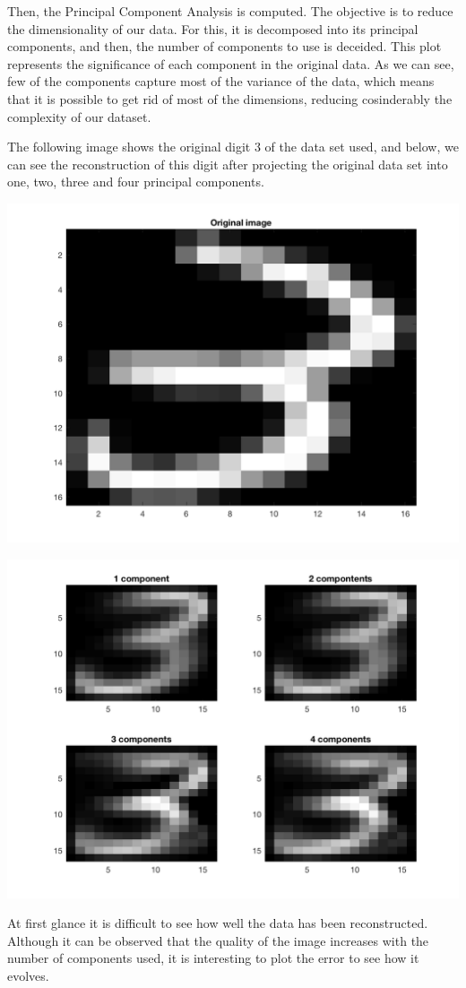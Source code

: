 \documentclass[10pt]{article}
\begin{document}
\begin{multicols}{2}
  Then, the Principal Component Analysis is computed. The objective is to reduce the
  dimensionality of our data. For this, it is decomposed into its principal components,
  and then, the number of components to use is deceided. This plot represents the
  significance of each component in the original data. As we can see,
  few of the components capture most of the variance of the data, which means that it
  is possible to get rid of most of the dimensions, reducing cosinderably the complexity
  of our dataset.

  The following image shows the original digit 3 of the data set used, and below, we can see
  the reconstruction of this digit after projecting the original data set into one, two,
  three and four principal components.

  \begin{center}
	\includegraphics[width=0.5\linewidth]{img/threeorig}
  \end{center}

  \begin{center}
	\includegraphics[width=0.8\linewidth]{img/threerec}
  \end{center}

  At first glance it is difficult to see how well the data has been reconstructed. Although
  it can be observed that the quality of the image increases with the number of components
  used, it is interesting to plot the error to see how it evolves.


\end{multicols}
\end{document}
